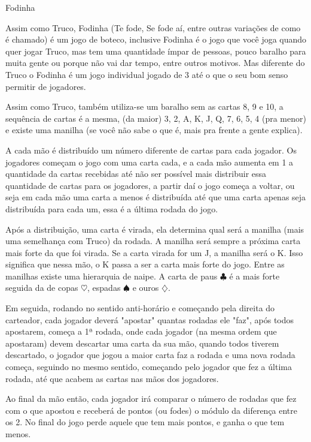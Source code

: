 \begin{subsecao}{Fodinha}

Assim como Truco, Fodinha (Te fode, Se fode aí, entre outras variações de
como é chamado) é um jogo de boteco, inclusive Fodinha é o jogo
que você joga quando quer jogar Truco, mas tem uma quantidade ímpar de 
pessoas, pouco baralho para muita gente ou porque não vai dar tempo, entre
outros motivos. Mas diferente do Truco o Fodinha é um jogo individual jogado de
3 até o que o seu bom senso permitir de jogadores.

Assim como Truco, também utiliza-se um baralho sem as cartas 8, 9 e 10, a sequência
de cartas é a mesma, (da maior) 3, 2, A, K, J, Q, 7, 6, 5, 4 (pra menor)
e existe uma manilha (se você não sabe o que é, mais pra frente a gente explica).

A cada mão é distribuído um número diferente de cartas para cada jogador. Os
jogadores começam o jogo com uma carta cada, e a cada mão aumenta em 1 a
quantidade da cartas recebidas até não ser possível mais distribuir essa quantidade de
cartas para os jogadores, a partir daí o jogo começa a voltar, ou seja em cada mão uma
carta a menos é distribuída até que uma carta apenas seja distribuída para 
cada um, essa é a última rodada do jogo. 

Após a distribuição, uma carta é virada, ela determina qual será a 
manilha (mais uma semelhança com Truco) da rodada. A manilha será sempre a próxima
carta mais forte da que foi virada. Se a carta virada for um J, a manilha será o K. Isso
significa que nessa mão, o K passa a ser a carta mais forte do jogo. Entre as manilhas
existe uma hierarquia de naipe. A carta de paus $\clubsuit$  é a mais forte seguida da de
copas $\heartsuit$, espadas $\spadesuit$ e ouros $\diamondsuit$.

Em seguida, rodando no sentido anti-horário e começando pela direita do carteador, cada
jogador deverá "apostar" quantas rodadas ele "faz", após todos apostarem, começa a 1ª
rodada, onde cada jogador (na mesma ordem que apostaram) devem descartar uma carta da sua
mão, quando todos tiverem descartado, o jogador que jogou a maior carta faz a rodada e uma
nova rodada começa, seguindo no mesmo sentido, começando pelo jogador que fez a última
rodada, até que acabem as cartas nas mãos dos jogadores.

Ao final da mão então, cada jogador irá comparar o número de rodadas que fez com o que
apostou e receberá de pontos (ou fodes) o módulo da diferença entre os 2. No final do jogo
perde aquele que tem mais pontos, e ganha o que tem menos.


\end{subsecao}
